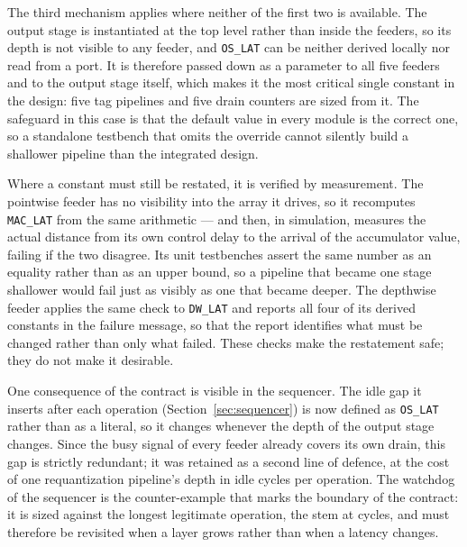 The third mechanism applies where neither of the first two is available. The
output stage is instantiated at the top level rather than inside the feeders, so
its depth is not visible to any feeder, and \texttt{OS\_LAT} can be neither
derived locally nor read from a port. It is therefore passed down as a parameter
to all five feeders and to the output stage itself, which makes it the most
critical single constant in the design: five tag pipelines and five drain
counters are sized from it. The safeguard in this case is that the default value
in every module is the correct one, so a standalone testbench that omits the
override cannot silently build a shallower pipeline than the integrated design.

Where a constant must still be restated, it is verified by measurement. The
pointwise feeder has no visibility into the array it drives, so it recomputes
\texttt{MAC\_LAT} from the same arithmetic --- and then, in simulation, measures
the actual distance from its own control delay to the arrival of the
accumulator value, failing if the two disagree. Its unit testbenches assert the
same number as an equality rather than as an upper bound, so a pipeline that
became one stage shallower would fail just as visibly as one that became
deeper. The depthwise feeder applies the same check to \texttt{DW\_LAT} and
reports all four of its derived constants in the failure message, so that the
report identifies what must be changed rather than only what failed. These
checks make the restatement safe; they do not make it desirable.

One consequence of the contract is visible in the sequencer. The idle gap it
inserts after each operation (Section~\ref{sec:sequencer}) is now defined as
\texttt{OS\_LAT} rather than as a literal, so it changes whenever the depth of
the output stage changes. Since the busy signal of every feeder already covers
its own drain, this gap is strictly redundant; it was retained as a second line
of defence, at the cost of one requantization pipeline's depth in idle cycles
per operation. The watchdog of the sequencer is the counter-example that marks
the boundary of the contract: it is sized against the longest legitimate
operation, the stem at \thStemCycles{} cycles, and must therefore be revisited
when a layer grows rather than when a latency changes.


